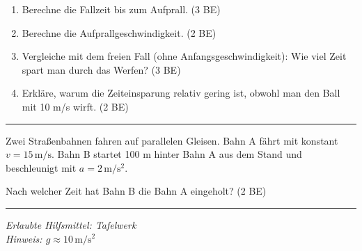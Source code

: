 \documentclass[11pt,a4paper]{article}
\newcounter{aufgabe}
\begin{document}
\begin{enumerate}
\item[a)] Berechne die Fallzeit bis zum Aufprall. \hfill (3 BE)

\vspace{3.5cm}

\item[b)] Berechne die Aufprallgeschwindigkeit. \hfill (2 BE)

\vspace{2.5cm}

\item[c)] Vergleiche mit dem freien Fall (ohne Anfangsgeschwindigkeit): Wie viel Zeit spart man durch das Werfen? \hfill (3 BE)

\vspace{3cm}

\item[d)] Erkläre, warum die Zeiteinsparung relativ gering ist, obwohl man den Ball mit 10 m/s wirft. \hfill (2 BE)

\vspace{2.5cm}
\end{enumerate}

\vspace{0.5cm}
\hrule
\vspace{0.3cm}

\noindent{}

\vspace{0.3cm}

Zwei Straßenbahnen fahren auf parallelen Gleisen. Bahn A fährt mit konstant $v = 15\,\mathrm{m/s}$. Bahn B startet 100 m hinter Bahn A aus dem Stand und beschleunigt mit $a = 2\,\mathrm{m/s^2}$.

Nach welcher Zeit hat Bahn B die Bahn A eingeholt? \hfill (2 BE)

\vspace{3cm}

\hrule
\vspace{0.3cm}
\begin{center}
\textit{Erlaubte Hilfsmittel: Tafelwerk}\\[0.2cm]
\textit{Hinweis: $g \approx 10\,\mathrm{m/s^2}$}
\end{center}
\end{document}
